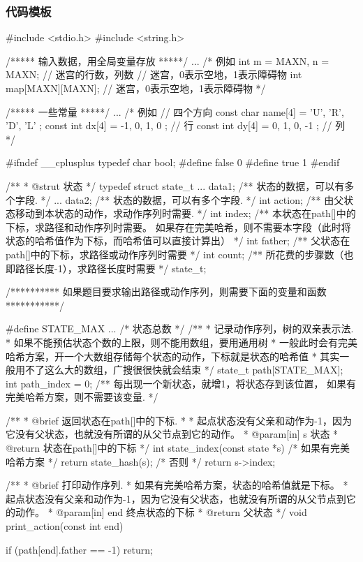 \subsubsection{代码模板}
\begin{Codex}[label=bfs_template.c]
#include <stdio.h>
#include <string.h>

/***** 输入数据，用全局变量存放 *****/
...
/*
例如
int m = MAXN, n = MAXN;  // 迷宫的行数，列数
// 迷宫，0表示空地，1表示障碍物
int map[MAXN][MAXN];  // 迷宫，0表示空地，1表示障碍物
 */

/***** 一些常量 *****/
...
/* 例如
// 四个方向
const char name[4] = { 'U', 'R', 'D', 'L' };
const int dx[4] = { -1, 0, 1, 0 }; // 行
const int dy[4] = { 0, 1, 0, -1 }; // 列
*/

#ifndef __cplusplus
typedef char bool;
#define false 0
#define true 1
#endif

/**
 * @strut 状态
 */
typedef struct state_t {
    ... data1;  /** 状态的数据，可以有多个字段. */
    ... data2;  /** 状态的数据，可以有多个字段. */
    int action; /** 由父状态移动到本状态的动作，求动作序列时需要. */
    int index;  /** 本状态在path[]中的下标，求路径和动作序列时需要。
                    如果存在完美哈希，则不需要本字段（此时将
                   状态的哈希值作为下标，而哈希值可以直接计算出） */
    int father; /** 父状态在path[]中的下标，求路径或动作序列时需要 */
    int count;  /** 所花费的步骤数（也即路径长度-1），求路径长度时需要 */
} state_t;

/********** 如果题目要求输出路径或动作序列，则需要下面的变量和函数 ***********/

#define STATE_MAX ...  /* 状态总数 */
/**
 * 记录动作序列，树的双亲表示法.
 * 如果不能预估状态个数的上限，则不能用数组，要用通用树
 * 一般此时会有完美哈希方案，开一个大数组存储每个状态的动作，下标就是状态的哈希值
 * 其实一般用不了这么大的数组，广搜很很快就会结束
 */
state_t path[STATE_MAX];
int path_index = 0;  /** 每出现一个新状态，就增1，将状态存到该位置，
                         如果有完美哈希方案，则不需要该变量. */

/**
 * @brief 返回状态在path[]中的下标.
 * 
 * 起点状态没有父亲和动作为-1，因为它没有父状态，也就没有所谓的从父节点到它的动作。
 * @param[in] s 状态
 * @return 状态在path[]中的下标
 */
int state_index(const state *s) {
    /* 如果有完美哈希方案 */
    return state_hash(s);
    /* 否则 */
    return s->index;
}

/**
 * @brief 打印动作序列.
 * 如果有完美哈希方案，状态的哈希值就是下标。
 * 起点状态没有父亲和动作为-1，因为它没有父状态，也就没有所谓的从父节点到它的动作。
 * @param[in] end 终点状态的下标
 * @return 父状态
 */
void print_action(const int end) {
    if (path[end].father == -1) return;

}
\end{Codex}
